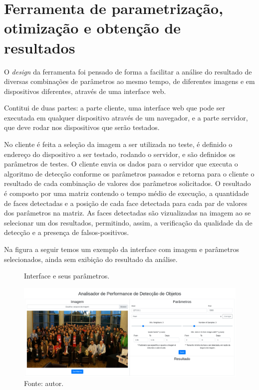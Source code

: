 \section{Ferramenta de parametrização, otimização e obtenção de resultados}

O \textit{design} da ferramenta foi pensado de forma a facilitar a análise do resultado de diversas combinações de parâmetros ao mesmo tempo, de diferentes imagens e em dispositivos diferentes, através de uma interface web.

Contitui de duas partes: a parte cliente, uma interface web que pode ser executada em qualquer dispositivo através de um navegador, e a parte servidor, que deve rodar nos dispositivos que serão testados.

No cliente é feita a seleção da imagem a ser utilizada no teste, é definido o endereço do dispositivo a ser testado, rodando o servidor, e são definidos os parâmetros de testes. O cliente envia os dados para o servidor que executa o algoritmo de detecção conforme os parâmetros passados e retorna para o cliente o resultado de cada combinação de valores dos parâmetros solicitados. O resultado é composto por uma matriz contendo o tempo médio de execução, a quantidade de faces detectadas e a posição de cada face detectada para cada par de valores dos parâmetros na matriz. As faces detectadas são vizualizadas na imagem ao se selecionar um dos resultados, permitindo, assim, a verificação da qualidade da de detecção e a presença de falsos-positivos.

Na figura a seguir temos um exemplo da interface com imagem e parâmetros selecionados, ainda sem exibição do resultado da análise.

\begin{figure}[h]
    \centering
    \caption[Interface e seus parâmetros.]{Interface e seus parâmetros.}
    \includegraphics[width=1.0\textwidth]{Cap3_Desenvolvimento/Figures/interface_parametros.png}
    \caption*{Fonte: autor.}
    \label{fig:interfaceUsuario}
\end{figure}

